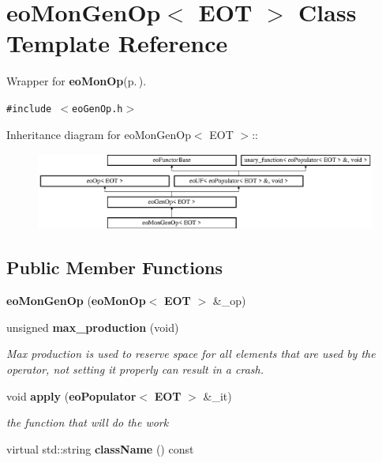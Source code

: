 \section{eo\-Mon\-Gen\-Op$<$ EOT $>$ Class Template Reference}
\label{classeo_mon_gen_op}
Wrapper for {\bf eo\-Mon\-Op}{\rm (p.\,\pageref{classeo_mon_op})}.  


{\tt \#include $<$eo\-Gen\-Op.h$>$}

Inheritance diagram for eo\-Mon\-Gen\-Op$<$ EOT $>$::\begin{figure}[H]
\begin{center}
\leavevmode
\includegraphics[height=2.54835cm]{classeo_mon_gen_op}
\end{center}
\end{figure}
\subsection*{Public Member Functions}
\begin{CompactItemize}
\item 
{\bf eo\-Mon\-Gen\-Op} ({\bf eo\-Mon\-Op}$<$ {\bf EOT} $>$ \&\_\-op)\label{classeo_mon_gen_op_a0}

\item 
unsigned {\bf max\_\-production} (void)\label{classeo_mon_gen_op_a1}

\begin{CompactList}\small\item\em Max production is used to reserve space for all elements that are used by the operator, not setting it properly can result in a crash. \item\end{CompactList}\item 
void {\bf apply} ({\bf eo\-Populator}$<$ {\bf EOT} $>$ \&\_\-it)\label{classeo_mon_gen_op_a2}

\begin{CompactList}\small\item\em the function that will do the work \item\end{CompactList}\item 
virtual std::string {\bf class\-Name} () const \label{classeo_mon_gen_op_a3}

\end{CompactItemize}

